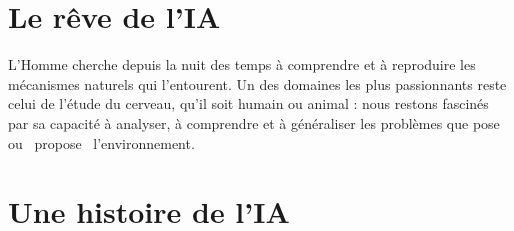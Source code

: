 \section{Le rêve de l'IA}
L'Homme cherche depuis la nuit des temps à comprendre et à reproduire les
mécanismes naturels qui l'entourent. Un des domaines les plus passionnants
reste celui de l'étude du cerveau, qu'il soit humain ou animal : nous restons
fascinés par sa capacité à analyser, à comprendre et à généraliser les problèmes
que pose ou \og{}~propose~\fg{} l'environnement.
\section{Une histoire de l'IA}